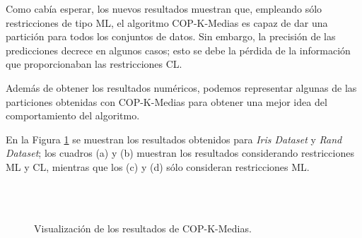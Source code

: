 Como cabía esperar, los nuevos resultados muestran que, empleando sólo restricciones de tipo \acs{ML}, el algoritmo COP-K-Medias es capaz de dar una partición para todos los conjuntos de datos. Sin embargo, la precisión de las predicciones decrece en algunos casos; esto se debe la pérdida de la información que proporcionaban las restricciones \acs{CL}. 

Además de obtener los resultados numéricos, podemos representar algunas de las particiones obtenidas con COP-K-Medias para obtener una mejor idea del comportamiento del algoritmo. 

En la Figura \ref{fig:figure24} se muestran los resultados obtenidos para \textit{Iris Dataset} y \textit{Rand Dataset}; los cuadros (a) y (b) muestran los resultados considerando restricciones ML y CL, mientras que los (c) y (d) sólo consideran restricciones ML.

\begin{figure}[bth]
	\myfloatalign
	\\
	\\
	\caption{Visualización de los resultados de COP-K-Medias.}\label{fig:figure24}
\end{figure}

